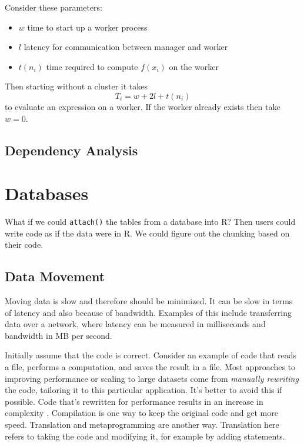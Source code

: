 \documentclass[12pt]{article}
\begin{document}
Consider these parameters:

\begin{itemize}
    \item $w$ time to start up a worker process
    \item $l$ latency for communication between manager and worker
    \item $t(n_i)$ time required to compute $f(x_i)$ on the worker
\end{itemize}

Then starting without a cluster it takes
\[
    T_i = w + 2l + t(n_i)
\]
to evaluate an expression on a worker. If the worker already exists then
take $w = 0$.

\subsection{Dependency Analysis}


\section{Databases}

What if we could \texttt{attach()} the tables from a database into R? Then users
could write code as if the data were in R. We could figure out the chunking
based on their code.


\subsection{Data Movement}

Moving data is slow and therefore should be minimized. It can be slow in
terms of latency and also because of bandwidth. Examples of this include
transferring data over a network, where latency can be measured in
milliseconds and bandwidth in MB per second.

Initially assume that the code is correct. Consider an example of code that
reads a file, performs a computation, and saves the result in a file.
Most approaches to improving performance or scaling to large datasets
come from \emph{manually rewriting} the code, tailoring it to this
particular application. It's better to avoid this if possible.  Code that's
rewritten for performance results in an increase in complexity
\cite{matloff2015parallel}.  Compilation is one way to keep the original
code and get more speed. Translation and metaprogramming are another way.
Translation here refers to taking the code and modifying it, for example by
adding statements.
\end{document}
